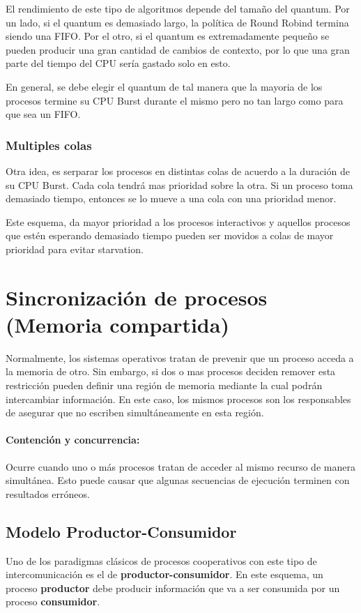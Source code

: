 	El rendimiento de este tipo de algoritmos depende del tamaño del quantum. Por un lado, si el quantum es demasiado largo, la política de Round Robind termina siendo una FIFO. Por el otro, si el quantum es extremadamente pequeño se pueden producir una gran cantidad de cambios de contexto, por lo que una gran parte del tiempo del CPU sería gastado solo en esto.
	
	En general, se debe elegir el quantum de tal manera que la mayoria de los procesos termine su CPU Burst durante el mismo pero no tan largo como para que sea un FIFO.
	
	\subsubsection{Multiples colas}
	Otra idea, es serparar los procesos en distintas colas de acuerdo a la duración de su CPU Burst. Cada cola tendrá mas prioridad sobre la otra. Si un proceso toma demasiado tiempo, entonces se lo mueve a una cola con una prioridad menor. 
	
	Este esquema, da mayor prioridad a los procesos interactivos y aquellos procesos que estén esperando demasiado tiempo pueden ser movidos a colas de mayor prioridad para evitar starvation.

\printbibliography[keyword=scheduling,title=Bibliografía]

\newpage
\section{Sincronización de procesos (Memoria compartida)}
Normalmente, los sistemas operativos tratan de prevenir que un proceso acceda a la memoria de otro. Sin embargo, si dos o mas procesos deciden remover esta restricción pueden definir una región de memoria mediante la cual podrán intercambiar información. En este caso, los mismos procesos son los responsables de asegurar que no escriben simultáneamente en esta región.

\paragraph{Contención y concurrencia:} Ocurre cuando uno o más procesos tratan de acceder al mismo recurso de manera simultánea. Esto puede causar que algunas secuencias de ejecución terminen con resultados erróneos.

\subsection{Modelo Productor-Consumidor}
Uno de los paradigmas clásicos de procesos cooperativos con este tipo de intercomunicación es el de \textbf{productor-consumidor}. En este esquema, un proceso \textbf{productor} debe producir información que va a ser consumida por un proceso \textbf{consumidor}.

